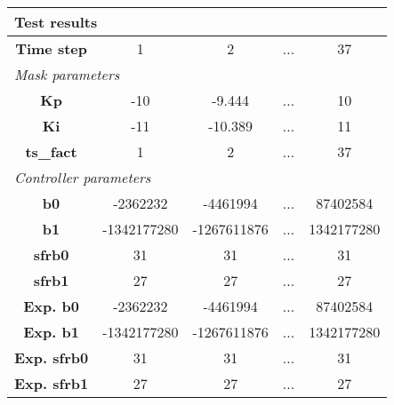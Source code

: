 \vspace{1em}
\begin{tabularx}{\textwidth}{|c|c|c|>{\centering\arraybackslash}X|c|}
\hline
\multicolumn{5}{|l|}{\cellcolor[gray]{0.8}\textbf{Test results}} \tabularnewline \hline
\textbf{Time step} & 1 & 2 & ... & 37 \tabularnewline \hline
\multicolumn{5}{|l|}{\cellcolor[gray]{0.9}\textit{Mask parameters}} \tabularnewline \hline
\textbf{Kp} & -10 & -9.444 & ... & 10 \tabularnewline \hline
\textbf{Ki} & -11 & -10.389 & ... & 11 \tabularnewline \hline
\textbf{ts\_fact} & 1 & 2 & ... & 37 \tabularnewline \hline
\multicolumn{5}{|l|}{\cellcolor[gray]{0.9}\textit{Controller parameters}} \tabularnewline \hline
\textbf{b0} & -2362232 & -4461994 & ... & 87402584 \tabularnewline \hline
\textbf{b1} & -1342177280 & -1267611876 & ... & 1342177280 \tabularnewline \hline
\textbf{sfrb0} & 31 & 31 & ... & 31 \tabularnewline \hline
\textbf{sfrb1} & 27 & 27 & ... & 27 \tabularnewline \hline
\textbf{Exp. b0} & -2362232 & -4461994 & ... & 87402584 \tabularnewline \hline
\textbf{Exp. b1} & -1342177280 & -1267611876 & ... & 1342177280 \tabularnewline \hline
\textbf{Exp. sfrb0} & 31 & 31 & ... & 31 \tabularnewline \hline
\textbf{Exp. sfrb1} & 27 & 27 & ... & 27 \tabularnewline \hline
\end{tabularx}
\vspace{1ex}
